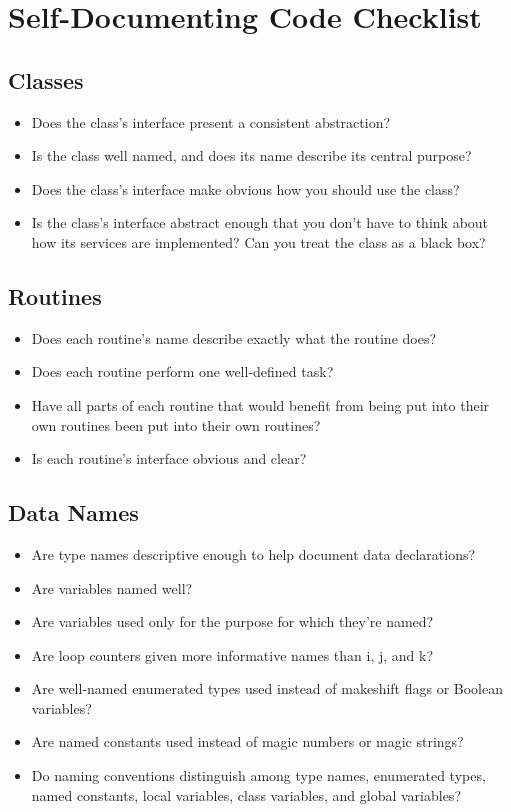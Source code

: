 \newpage
\section{Self-Documenting Code Checklist}
\subsection{Classes}
\begin{itemize}
\item Does the class’s interface present a consistent abstraction?
\item Is the class well named, and does its name describe its central purpose? 
\item Does the class’s interface make obvious how you should use the class? 
\item Is the class’s interface abstract enough that you don’t have to think about how its services are implemented? Can you treat the class as a black box?
\end{itemize}

\subsection{Routines}
\begin{itemize}
\item Does each routine’s name describe exactly what the routine does?
\item Does each routine perform one well-defined task?
\item Have all parts of each routine that would benefit from being put into their own routines been put into their own routines?
\item Is each routine’s interface obvious and clear?
\end{itemize}

\subsection{Data Names}
\begin{itemize}
\item Are type names descriptive enough to help document data declarations?
\item Are variables named well?
\item Are variables used only for the purpose for which they’re named?
\item Are loop counters given more informative names than i, j, and k?
\item Are well-named enumerated types used instead of makeshift flags or Boolean variables?
\item Are named constants used instead of magic numbers or magic strings?
\item Do naming conventions distinguish among type names, enumerated types, named constants, local variables, class variables, and global variables?
\end{itemize}

